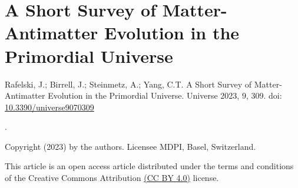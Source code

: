 \chapter{A Short Survey of Matter-Antimatter Evolution in the Primordial Universe}
\begin{center}
Rafelski, J.; Birrell, J.; Steinmetz, A.; Yang, C.T. A Short Survey of Matter-Antimatter Evolution in the Primordial Universe. Universe 2023, 9, 309.
doi: \href{https://doi.org/10.3390/universe9070309}{10.3390/universe9070309}

.

Copyright (2023) by the authors. Licensee MDPI, Basel, Switzerland.

This article is an open access article distributed under the terms and conditions of the Creative Commons Attribution \href{https://creativecommons.org/licenses/by/4.0/}{(CC BY 4.0)} license.

\end{center}

